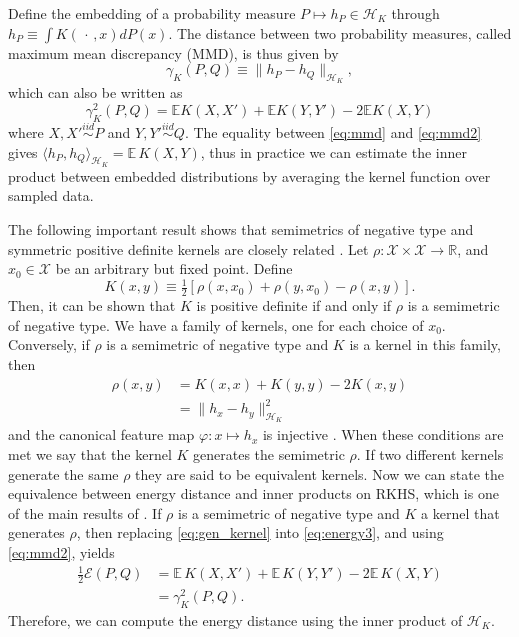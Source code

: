 \documentclass[twoside]{article}
\newcommand\Energy{\mathcal{E}}
\newcommand\E{\mathbb{E}}
\newcommand\kk{K}
\newcommand\kkk{h}
\newcommand\Hk{{\mathcal{H}}_{\kk}}
\begin{document}
Define the embedding of a probability measure
$P \mapsto \kkk_P \in \Hk$ through
$\kkk_P \equiv \int \kk( \, \cdot \,, x)  d P(x)$. 
The distance between two probability measures, 
called maximum mean discrepancy (MMD), is thus given by
\begin{equation}
\label{eq:mmd}
\gamma_\kk(P,Q) \equiv \| \kkk_P - \kkk_Q \|_{\Hk},
\end{equation}
which can also be written as \citep{Gretton2012}
\begin{equation}\label{eq:mmd2}
\gamma_\kk^2(P,Q) = \E \kk(X,X') + \E \kk(Y,Y') - 2 \E \kk(X, Y)
\end{equation}
where $X,X' \stackrel{iid}{\sim} P$ and $Y,Y'\stackrel{iid}{\sim} Q$.
The equality between \eqref{eq:mmd} and \eqref{eq:mmd2}
gives $\langle \kkk_P, \kkk_Q \rangle_{\Hk} = \E \, \kk(X, Y)$,
thus in practice we can estimate the inner product between  
embedded distributions by averaging the kernel function over sampled data.

The following important result shows that semimetrics of negative
type and symmetric positive definite kernels are closely related
\citep{Berg1984}. Let $\rho: \mathcal{X} \times \mathcal{X} \to \mathbb{R}$,
and $x_0 \in \mathcal{X}$ be an arbitrary but fixed point.
Define
\begin{equation}
\label{eq:kernel_semimetric}
\kk(x,y) \equiv 
\tfrac{1}{2} \left[  \rho(x,x_0) + \rho(y,x_0) - \rho(x,y)\right].
\end{equation}
Then, it can be shown that 
$\kk$ is positive definite if and only if $\rho$ is a semimetric
of negative type.
We have a family of kernels, one for each choice of $x_0$. Conversely,
if $\rho$ is a semimetric of negative type and $\kk$ is a kernel in this
family, then 
\begin{equation}
\label{eq:gen_kernel}
\begin{split}
\rho(x,y) &= \kk(x,x) + \kk(y,y) -2\kk(x,y) \\
&=  \| \kkk_x - \kkk_y \|^2_{\Hk}
\end{split}
\end{equation}
and the canonical feature map 
$\varphi: x \mapsto \kkk_x$ is injective \citep{Sejdinovic2013}.
When these conditions are met we say that the kernel $\kk$ 
generates the semimetric $\rho$. 
If two different kernels generate the same $\rho$ they are
said to be equivalent kernels.
Now we can state the equivalence between energy distance and
inner products on RKHS, which is one of the main results of
\citep{Sejdinovic2013}. If $\rho$ is a semimetric
of negative type and $\kk$ a kernel that generates $\rho$, then
replacing \eqref{eq:gen_kernel} into
\eqref{eq:energy3}, and using \eqref{eq:mmd2}, yields
\begin{equation}
\label{eq:Erho}
\begin{split}
\tfrac{1}{2}\Energy(P, Q) &= 
\E \, \kk(X, X') + \E \, \kk(Y, Y') - 2\E \, \kk(X, Y) \\ 
&= \gamma_\kk^2(P,Q) .
\end{split}
\end{equation}
Therefore, we can compute the energy distance using the inner product
of $\Hk$.
\end{document}
